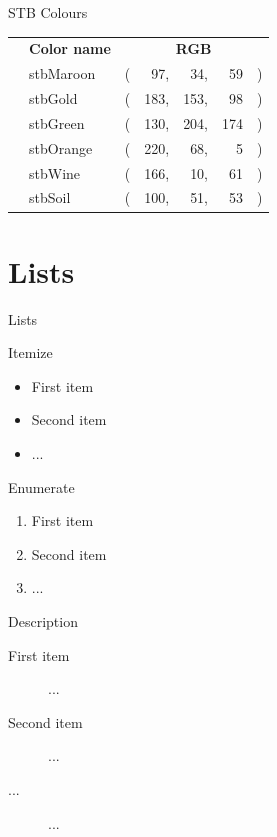 \documentclass[xcolor={svgnames,table},10pt,fleqn]{beamer}
\begin{document}
\begin{frame}{STB Colours}
\begin{center}
\begin{tabular}{llr@{}r@{ }r@{ }r@{}r@{}}
 & \textbf{Color name} & \multicolumn{5}{c}{\textbf{RGB}} \\[0.25ex]
 \cmidrule(lr){2-2}
 \cmidrule(l){3-7}
\colorbox{stbMaroon}{\phantom{XXXXX}} & {stbMaroon} &(&  97,&  34,&  59&) \\[0.25ex]
\colorbox{stbGold}  {\phantom{XXXXX}} & {stbGold}   &(& 183,& 153,&  98&) \\[0.25ex]
\colorbox{stbGreen} {\phantom{XXXXX}} & {stbGreen}  &(& 130,& 204,& 174&) \\[0.25ex]
\colorbox{stbOrange}{\phantom{XXXXX}} & {stbOrange} &(& 220,&  68,&   5&) \\[0.25ex]
\colorbox{stbWine}  {\phantom{XXXXX}} & {stbWine}   &(& 166,&  10,&  61&) \\[0.25ex]
\colorbox{stbSoil}  {\phantom{XXXXX}} & {stbSoil}   &(& 100,&  51,&  53&) \\
\end{tabular}
\end{center}
\end{frame}


\section{Lists}
\begin{frame}{Lists}
\begin{block}{Itemize}
\begin{itemize}
    \item First item
    \item Second item
    \item ...
\end{itemize}
\end{block}
\begin{block}{Enumerate}
\begin{enumerate}
    \item First item
    \item Second item
    \item ...
\end{enumerate}
\end{block}
\begin{block}{Description}
\begin{description}
    \item[First item] ...
    \item[Second item] ...
    \item [...] ...
\end{description}
\end{block}

\end{frame}
\end{document}
